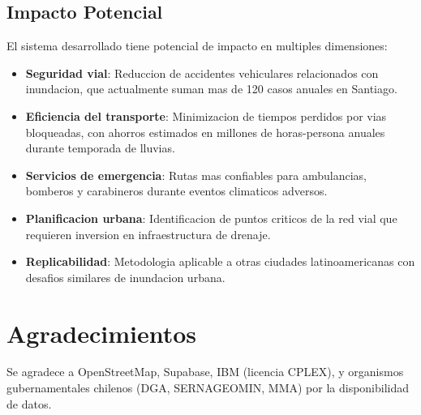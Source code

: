 \documentclass[conference]{IEEEtran}
\begin{document}
\subsection{Impacto Potencial}

El sistema desarrollado tiene potencial de impacto en multiples dimensiones:

\begin{itemize}
    \item \textbf{Seguridad vial}: Reduccion de accidentes vehiculares relacionados con inundacion, que actualmente suman mas de 120 casos anuales en Santiago.

    \item \textbf{Eficiencia del transporte}: Minimizacion de tiempos perdidos por vias bloqueadas, con ahorros estimados en millones de horas-persona anuales durante temporada de lluvias.

    \item \textbf{Servicios de emergencia}: Rutas mas confiables para ambulancias, bomberos y carabineros durante eventos climaticos adversos.

    \item \textbf{Planificacion urbana}: Identificacion de puntos criticos de la red vial que requieren inversion en infraestructura de drenaje.

    \item \textbf{Replicabilidad}: Metodologia aplicable a otras ciudades latinoamericanas con desafios similares de inundacion urbana.
\end{itemize}

\section*{Agradecimientos}

Se agradece a OpenStreetMap, Supabase, IBM (licencia CPLEX), y organismos gubernamentales chilenos (DGA, SERNAGEOMIN, MMA) por la disponibilidad de datos.
\end{document}
